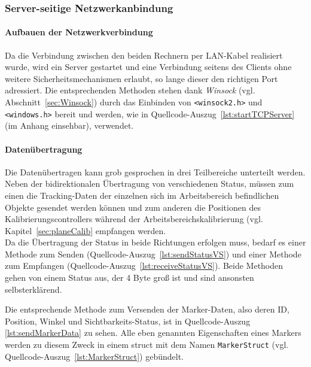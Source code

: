 \subsubsection{Server-seitige Netzwerkanbindung}\label{sec:serverClient}
\paragraph{Aufbauen der Netzwerkverbindung}
Da die Verbindung zwischen den beiden Rechnern per LAN-Kabel realisiert wurde, wird ein Server gestartet und eine Verbindung seitens des Clients ohne weitere Sicherheitsmechanismen erlaubt, so lange dieser den richtigen Port adressiert. Die entsprechenden Methoden stehen dank \textit{Winsock} (vgl. Abschnitt~\ref{sec:Winsock}) durch das Einbinden von \texttt{<winsock2.h>} und \texttt{<windows.h>} bereit und werden, wie in Quellcode-Auszug~\ref{lst:startTCPServer} (im Anhang einsehbar), verwendet. 

\paragraph{Datenübertragung}
Die Datenübertragen kann grob gesprochen in drei Teilbereiche unterteilt werden. Neben der bidirektionalen Übertragung von verschiedenen Status, müssen zum einen die Tracking-Daten der einzelnen sich im Arbeitsbereich befindlichen Objekte gesendet werden können und zum anderen die Positionen des Kalibrierungscontrollers während der Arbeitsbereichskalibrierung (vgl. Kapitel~\ref{sec:planeCalib} empfangen werden. \\

 

Da die Übertragung der Status in beide Richtungen erfolgen muss, bedarf es einer Methode zum Senden (Quellcode-Auszug~\ref{lst:sendStatusVS})  und einer Methode zum Empfangen (Quellcode-Auszug~\ref{lst:receiveStatusVS}). Beide Methoden gehen von einem Status aus, der 4 Byte groß ist und sind ansonsten selbsterklärend. 



Die entsprechende Methode zum Versenden der Marker-Daten, also deren ID, Position, Winkel und Sichtbarkeits-Status, ist in Quellcode-Auszug \ref{lst:sendMarkerData} zu sehen. Alle eben genannten Eigenschaften eines Markers werden zu diesem Zweck in einem struct mit dem Namen \texttt{MarkerStruct} (vgl. Quellcode-Auszug~\ref{lst:MarkerStruct}) gebündelt. 

